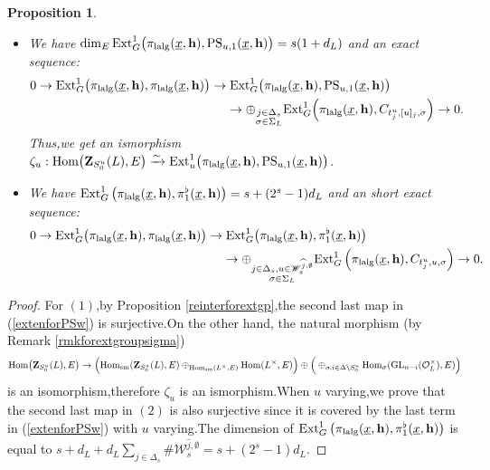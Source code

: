 \documentclass[10pt]{article}
\newtheorem{pro}[thm]{Proposition}
\newcommand{\homo}{{\rm Hom}}
\newcommand{\ext}{{\rm Ext}}
\newcommand{\GLN}{{\rm GL}}
\newcommand{\sm}{{\rm sm}}
\newcommand{\lalg}{{\rm lalg}}
\newcommand{\bZ}{{\mathbf{Z}}}
\newcommand{\bh}{{\mathbf{h}}}
\newcommand{\cO}{\mathcal O}
\newcommand{\sW}{\mathscr W}
\begin{document}
\begin{pro}\label{extpi1repn}
	\begin{itemize}
		\item[(1)] We have  $\dim_E\ext^1_{G}\big(\pi_{\lalg}(\underline{x},\bh),\mathrm{PS}_{u,1}(\underline{x},\bh)\big)=s(1+d_L)$ and an exact sequence:
		\begin{equation}\label{extenforPSw}
			\begin{aligned}
				0\rightarrow \ext^1_{G}\big(\pi_{\lalg}(\underline{x},\bh),\pi_{\lalg}(\underline{x},\bh)\big)\rightarrow &\;\ext^1_{G}\big(\pi_{\lalg}(\underline{x},\bh),\mathrm{PS}_{u,1}(\underline{x},\bh)\big)\\
				&\rightarrow \oplus_{\substack{j\in \Delta_s\\\sigma\in \Sigma_L}}  \ext^1_{G}\Big(\pi_{\lalg}(\underline{x},\bh),C_{t_j^u,[u]_j,\sigma}\Big)\rightarrow 0 .
			\end{aligned}
		\end{equation}
		Thus,\;we get an ismorphism $\zeta_u:\homo\big(\bZ_{S^u_0}(L),E\big)\xrightarrow{\sim}\ext^1_{u}\big(\pi_{\lalg}(\underline{x},\bh),\mathrm{PS}_{u,1}(\underline{x},\bh)\big)$.\;
		\item[(2)]We have $\ext^1_{G}\left(\pi_{\lalg}(\underline{x},\bh),\pi^{\flat}_1(\underline{x},\bh)\right)=s+(2^s-1)d_L$ and an short exact sequence:
		\begin{equation}
			\begin{aligned}
				0\rightarrow \ext^1_{G}\big(\pi_{\lalg}(\underline{x},\bh),\pi_{\lalg}(\underline{x},\bh)\big)\rightarrow &\;\ext^1_{G}\big(\pi_{\lalg}(\underline{x},\bh),\pi^{\flat}_1(\underline{x},\bh)\big)\\
				&\rightarrow \oplus_{\substack{j\in \Delta_s,u\in \sW_{s}^{\widehat{j},\emptyset}\\\sigma\in \Sigma_L}}  \ext^1_{G}\left(\pi_{\lalg}(\underline{x},\bh),C_{t^u_j,u,\sigma}\right)\rightarrow 0 .
			\end{aligned}
		\end{equation}
	\end{itemize}
\end{pro}
\begin{proof}
	For $(1)$,\;by Proposition \ref{reinterforextgp},\;the second last map in (\ref{extenforPSw}) is surjective.\;On the other hand,\;
	the natural morphism (by Remark \ref{rmkforextgroupsigma})
	\[\homo\big(\bZ_{S^u_0}(L),E\big)\rightarrow \Big(\homo_{\sm}(\bZ_{S^u_0}(L),E)\oplus_{\homo_{\sm}(L^{\times},E)}\homo(L^{\times},E)\Big)\oplus \Big(\oplus_{\sigma,i\in \Delta\backslash S_0^u}\homo_{\sigma}(\GLN_{n-i}(\cO_L^{\times}),E)\Big)\]
	is an isomorphism,\;therefore $\zeta_u$ is an ismorphism.\;When $u$ varying,\;we prove that the second last map in $(2)$ is also surjective since it is covered by the last term in (\ref{extenforPSw}) with $u$ varying.\;The dimension of $\ext^1_{G}\left(\pi_{\lalg}(\underline{x},\bh),\pi^{\flat}_1(\underline{x},\bh)\right)$ is equal to $s+d_L+d_L\sum_{j\in \Delta_s}\#\sW_{s}^{\widehat{j},\emptyset}=s+(2^s-1)d_L$.\;
\end{proof}
\end{document}
